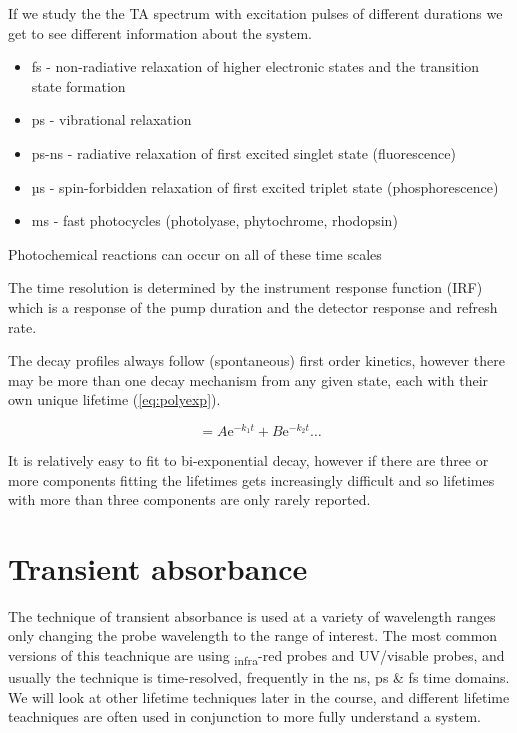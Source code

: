 \documentclass[
]{book}
\providecommand{\tightlist}{%
  \setlength{\itemsep}{0pt}\setlength{\parskip}{0pt}}
\begin{document}
If we study the the TA spectrum with excitation pulses of different durations we get to see different information about the system.

\begin{itemize}
\tightlist
\item
  fs - non-radiative relaxation of higher electronic states and the transition state formation
\item
  ps - vibrational relaxation
\item
  ps-ns - radiative relaxation of first excited singlet state (fluorescence)
\item
  µs - spin-forbidden relaxation of first excited triplet state (phosphorescence)
\item
  ms - fast photocycles (photolyase, phytochrome, rhodopsin)
\end{itemize}

Photochemical reactions can occur on all of these time scales

The time resolution is determined by the instrument response function (IRF) which is a response of the pump duration and the detector response and refresh rate.

The decay profiles always follow (spontaneous) first order kinetics, however there may be more than one decay mechanism from any given state, each with their own unique lifetime (\eqref{eq:polyexp}).

\begin{equation}
[S*]=A \textrm{e}^{-k_1t}+ B \textrm{e}^{-k_2t} \dots
\label{eq:polyexp}
\end{equation}

It is relatively easy to fit to bi-exponential decay, however if there are three or more components fitting the lifetimes gets increasingly difficult and so lifetimes with more than three components are only rarely reported.

\hypertarget{transient-absorbance}{%
\section{Transient absorbance}\label{transient-absorbance}}

The technique of transient absorbance is used at a variety of wavelength ranges only changing the probe wavelength to the range of interest. The most common versions of this teachnique are using \textsubscript{infra}-red probes and UV/visable probes, and usually the technique is time-resolved, frequently in the ns, ps \& fs time domains. We will look at other lifetime techniques later in the course, and different lifetime teachniques are often used in conjunction to more fully understand a system.
\end{document}
